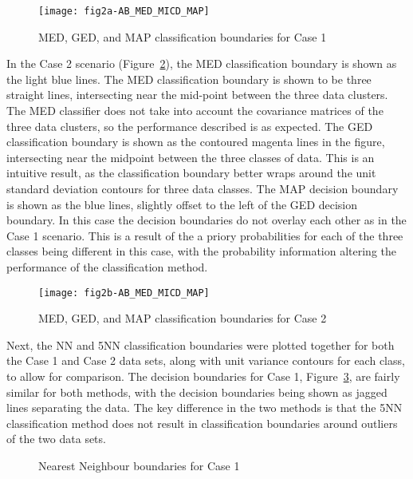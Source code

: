 \begin{figure}[ht]
\centering
	{
	\texttt{[image: fig2a-AB\_MED\_MICD\_MAP]}
	}
	
	\caption{MED, GED, and MAP classification boundaries for Case 1}
	\label{fig:med_ged_map_classifier_case1}
\end{figure}

In the Case 2 scenario (Figure~\ref{fig:med_ged_map_classifier_case2}), the MED classification boundary is shown as the light blue lines. The MED classification boundary is shown to be three straight lines, intersecting near the mid-point between the three data clusters. The MED classifier does not take into account the covariance matrices of the three data clusters, so the performance described is as expected. The GED classification boundary is shown as the contoured magenta lines in the figure, intersecting near the midpoint between the three classes of data. This is an intuitive result, as the classification boundary better wraps around the unit standard deviation contours for three data classes. The MAP decision boundary is shown as the blue lines, slightly offset to the left of the GED decision boundary. In this case the decision boundaries do not overlay each other as in the Case 1 scenario. This is a result of the a priory probabilities for each of the three classes being different in this case, with the probability information altering the performance of the classification method.

\begin{figure}[ht]
\centering
	{
	\texttt{[image: fig2b-AB\_MED\_MICD\_MAP]}
	}
	
	\caption{MED, GED, and MAP classification boundaries for Case 2}
	\label{fig:med_ged_map_classifier_case2}
\end{figure}

Next, the NN and 5NN classification boundaries were plotted together for both the Case 1 and Case 2 data sets, along with unit variance contours for each class, to allow for comparison. The decision boundaries for Case 1, Figure~\ref{fig:nn_boundary_case1}, are fairly similar for both methods, with the decision boundaries being shown as jagged lines separating the data. The key difference in the two methods is that the 5NN classification method does not result in classification boundaries around outliers of the two data sets.

\begin{figure}[ht]
\centering
	
	\caption{Nearest Neighbour boundaries for Case 1}
	\label{fig:nn_boundary_case1}
\end{figure}


